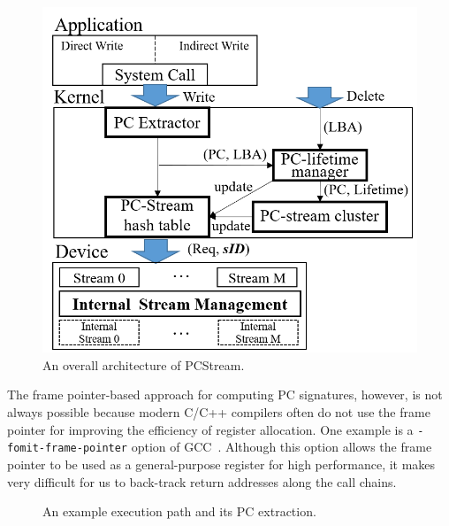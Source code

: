 \begin{figure}[t]
	\centering
	\includegraphics[width=0.6\linewidth]{figure/overview}
	\caption{An overall architecture of \textsf{\small PCStream}.}
	\label{fig:architecture}
\end{figure}


The frame pointer-based approach for computing PC signatures, however, is not
always possible because modern C/C++ compilers often do not use the frame
pointer for improving the efficiency of register allocation.
One example is a
{\tt -fomit-frame-pointer} option of GCC~\cite{GCC}. 
Although this option allows the frame pointer to be used as a general-purpose
register for high performance, it makes very difficult for us to back-track
return addresses along the call chains.  

\begin{figure}[b]
	\centering
	\hfill
	\caption{An example execution path and its PC extraction.} %
	\label{fig:getpc}
\end{figure}

